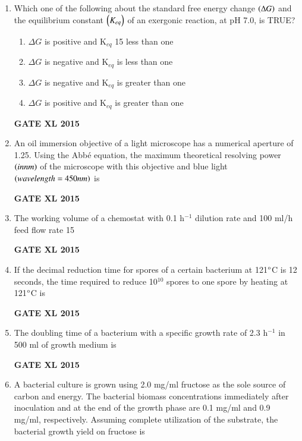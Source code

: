 \documentclass[journal,12pt,onecolumn]{IEEEtran}
\begin{document}
\begin{enumerate}
\item Which one of the following about the standard free energy change $\left(\Delta G\right)$ and the equilibrium constant $\left(K_{eq}\right)$ of an exergonic reaction, at pH 7.0, is TRUE?
    \begin{enumerate}
            \item $\Delta G$ is positive and K$_{eq}$ 15 less than one
	    \item $\Delta G$ is negative and K$_{eq}$ is less than one
	    \item $\Delta G$ is negative and K$_{eq}$ is greater than one
            \item $\Delta G$ is positive and K$_{eq}$ is greater than one
    \end{enumerate}
\begin{flushright}\textbf{GATE XL 2015}\end{flushright}
\item An oil immersion objective of a light microscope has a numerical aperture of 1.25. Using the Abbé equation, the maximum theoretical resolving power $\left(in nm\right)$ of the microscope with this objective and blue light $\left(wavelength=450 nm\right)$ is

\begin{flushright}\textbf{GATE XL 2015}\end{flushright}
\item The working volume  of a chemostat with 0.1 h$^{-1}$ dilution rate and 100 ml/h feed flow rate 15
\begin{flushright}\textbf{GATE XL 2015}\end{flushright}
\item If the decimal reduction time for spores of a certain bacterium at 121$\degree$C is 12 seconds, the time required  to reduce 10$^{10}$ spores to one spore by heating at 121$\degree$C is
\begin{flushright}\textbf{GATE XL 2015}\end{flushright}
\item	The doubling time  of a bacterium with a specific growth rate of 2.3 h$^{-1}$ in 500 ml of growth medium is
\begin{flushright}\textbf{GATE XL 2015}\end{flushright}
\item
A bacterial culture is grown using 2.0 mg/ml fructose as the sole source of carbon and energy. The bacterial biomass concentrations immediately after inoculation and at the end of the growth phase are 0.1 mg/ml and 0.9 mg/ml, respectively. Assuming complete utilization of the substrate, the bacterial growth yield  on fructose is 
        

\end{enumerate}
\end{document}
